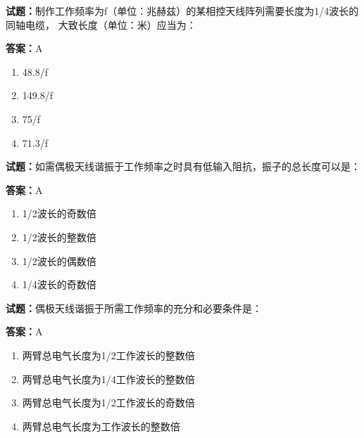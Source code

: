 \documentclass{ctexbook}
\begin{document}




\vspace{1em}

\textbf{试题：}制作工作频率为f（单位：兆赫兹）的某相控天线阵列需要长度为1/4波长的同轴电缆，
大致长度（单位：米）应当为： 

\textbf{答案：}A 

\begin{enumerate}[leftmargin=3em]
  \item 48.8/f 

  \item 149.8/f 

  \item 75/f 

  \item 71.3/f 

\end{enumerate}





\vspace{1em}

\textbf{试题：}如需偶极天线谐振于工作频率之时具有低输入阻抗，振子的总长度可以是： 

\textbf{答案：}A 

\begin{enumerate}[leftmargin=3em]
  \item 1/2波长的奇数倍 

  \item 1/2波长的整数倍 

  \item 1/2波长的偶数倍 

  \item 1/4波长的奇数倍 

\end{enumerate}






\vspace{1em}

\textbf{试题：}偶极天线谐振于所需工作频率的充分和必要条件是： 

\textbf{答案：}A 

\begin{enumerate}[leftmargin=3em]
  \item 两臂总电气长度为1/2工作波长的整数倍 

  \item 两臂总电气长度为1/4工作波长的整数倍 

  \item 两臂总电气长度为1/2工作波长的奇数倍 

  \item 两臂总电气长度为工作波长的整数倍 

\end{enumerate}
\end{document}
